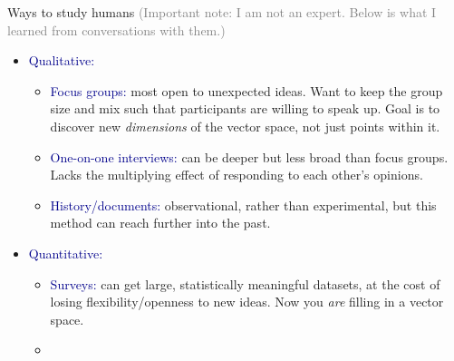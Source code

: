 \documentclass[aspectratio=169]{beamer}
\begin{document}
\begin{frame}{Ways to study humans}
\vspace{0.1 cm}
\textcolor{gray}{\scriptsize (Important note: I am not an expert. Below is what I learned from conversations with them.)}

\large
\vspace{0.1 cm}
\begin{itemize}\setlength{\itemsep}{0.25 cm}
\item<1-> \textcolor{darkblue}{Qualitative:}

\vspace{0.05 cm}
\begin{itemize}\large\setlength{\itemsep}{0.15 cm}
\item \textcolor{darkblue}{Focus groups:} \normalsize most open to unexpected ideas. Want to keep the group size and mix such that participants are willing to speak up. Goal is to discover new {\it dimensions} of the vector space, not just points within it. \large

\item \textcolor{darkblue}{One-on-one interviews:} \normalsize can be deeper but less broad than focus groups. Lacks the multiplying effect of responding to each other's opinions. \large

\item \textcolor{darkblue}{History/documents:} \normalsize observational, rather than experimental, but this method can reach further into the past. \large
\end{itemize}

\item<2-> \textcolor{darkblue}{Quantitative:}

\vspace{0.05 cm}
\begin{itemize}\large\setlength{\itemsep}{0.15 cm}
\item \textcolor{darkblue}{Surveys:} \normalsize can get large, statistically meaningful datasets, at the cost of losing flexibility/openness to new ideas. Now you {\it are} filling in a vector space. \large

\item {} \large
\end{itemize}

\end{itemize}

\vspace{10 cm}
\end{frame}
\end{document}
